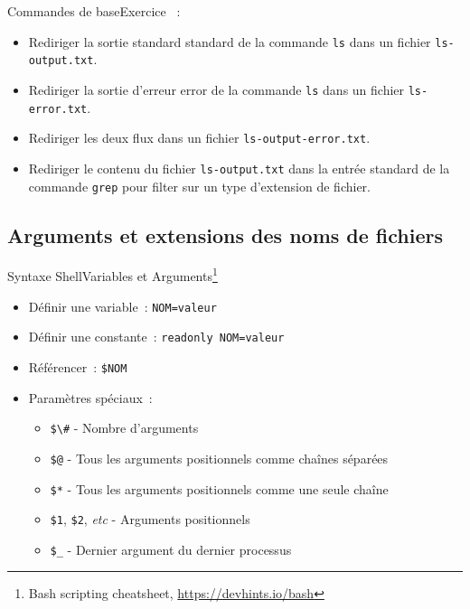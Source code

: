 \documentclass{beamer}
\begin{document}
    \begin{frame}{Commandes de base}{Exercice \execcounterdispinc{}~:}
        \begin{itemize}
            \item Rediriger la sortie standard standard de la commande \lstinline{ls} dans un fichier \lstinline{ls-output.txt}.
            \item Rediriger la sortie d'erreur error de la commande \lstinline{ls} dans un fichier \lstinline{ls-error.txt}.
            \item Rediriger les deux flux dans un fichier \lstinline{ls-output-error.txt}.
            \item Rediriger le contenu du fichier \lstinline{ls-output.txt} dans la entrée standard de la commande \lstinline{grep} pour filter sur un type d'extension de fichier.
        \end{itemize}
    \end{frame}

    \subsection{Arguments et extensions des noms de fichiers}\label{subsec:arguments-extension}


    \begin{frame}{Syntaxe Shell}{Variables et Arguments\footnote{\label{devhint-bash}Bash scripting cheatsheet, \url{https://devhints.io/bash}}}
        \bigbreak
        \begin{itemize}
            \item Définir une variable~: \lstinline{NOM=valeur}
            \item Définir une constante~: \lstinline{readonly NOM=valeur}
            \item Référencer~: \lstinline{$NOM}
            \item Paramètres spéciaux~:
            \begin{itemize}
                \item \lstinline{$\#} - Nombre d'arguments
                \item \lstinline{$@} - Tous les arguments positionnels comme chaînes séparées
                \item \lstinline{$*} - Tous les arguments positionnels comme une seule chaîne
                \item \lstinline{$1}, \lstinline{$2}, \textit{etc} - Arguments positionnels
                \item \lstinline{$_} - Dernier argument du dernier processus
            \end{itemize}
        \end{itemize}
    \end{frame}
\end{document}
